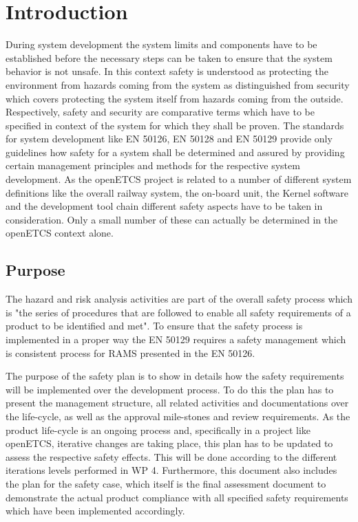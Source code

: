 \documentclass{template/openetcs_report}
\begin{document}

\mainmatter

\chapter{Introduction}
\label{sec:introduction}

During system development the system limits and components have to be established before the necessary steps can be taken to ensure that the system behavior is not unsafe. In this context safety is understood as protecting the environment from hazards coming from the system as distinguished from security which covers protecting the system itself from hazards coming from the outside. Respectively, safety and security are comparative terms which have to be specified in context of the system for which they shall be proven. The standards for system development like EN 50126, EN 50128 and EN 50129 provide only guidelines how safety for a system shall be determined and assured by providing certain management principles and methods for the respective system development. As the openETCS project is related to a number of different system definitions like the overall railway system, the on-board unit, the Kernel software and the development tool chain different safety aspects have to be taken in consideration. Only a small number of these can actually be determined in the openETCS context alone.

\section{Purpose}
\label{sec:purpose}

The hazard and risk analysis activities are part of the overall safety process which is "the series of procedures that are followed to enable all safety requirements of a product to be identified and met". To ensure that the safety process is implemented in a proper way the EN 50129 requires a safety management which is consistent process for RAMS presented in the EN 50126. 

The purpose of the safety plan is to show in details how the safety requirements will be implemented over the development process. To do this the plan has to present the management structure, all related activities and documentations over the life-cycle, as well as the approval mile-stones and review requirements. As the product life-cycle is an ongoing process and, specifically in a project like openETCS, iterative changes are taking place, this plan has to be updated to assess the respective safety effects. This will be done according to the different iterations levels performed in WP 4. 
Furthermore, this document also includes the plan for the safety case, which itself is the final assessment document to demonstrate the actual product compliance with all specified safety requirements which have been implemented accordingly.
\end{document}
